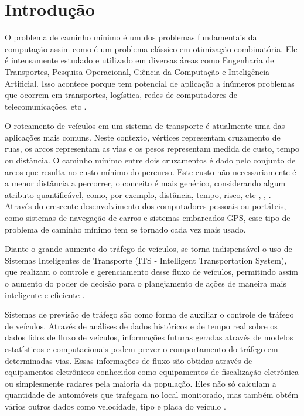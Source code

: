 \chapter{Introdução}

O problema de caminho mínimo é um dos problemas fundamentais da computação assim como é um problema
clássico em otimização combinatória.
Ele é intensamente estudado e utilizado em diversas áreas como Engenharia de Transportes, Pesquisa Operacional, Ciência
da Computação e Inteligência Artificial. Isso acontece porque tem potencial de aplicação a
inúmeros problemas que ocorrem em transportes, logística, redes de computadores de
telecomunicações, etc \cite{peer}.

O roteamento de veículos em um sistema de transporte é atualmente uma das aplicações mais comuns.
Neste contexto, vértices representam cruzamento de ruas, os arcos representam as vias
e os pesos representam medida de custo, tempo ou distância. O caminho mínimo entre dois cruzamentos
é dado pelo conjunto de arcos que resulta no custo mínimo do percurso.
Este custo não necessariamente é a menor distância a percorrer,
o conceito é mais genérico, considerando algum atributo quantificável, como,
por exemplo, distância, tempo, risco, etc \cite{boaventura}, \cite{cormen}, \cite{ziviani}.
Através do crescente desenvolvimento dos computadores pessoais ou portáteis, como sistemas
de navegação de carros e sistemas embarcados GPS, esse tipo de problema de caminho mínimo
tem se tornado cada vez mais usado.

Diante o grande aumento do tráfego de veículos, se torna indispensável o uso de Sistemas Inteligentes
de Transporte (ITS - Intelligent Transportation System), que realizam o controle e gerenciamento desse fluxo de veículos,
permitindo assim o aumento do poder de decisão para o planejamento de ações de maneira
mais inteligente e eficiente \cite{leonard}.

Sistemas de previsão de tráfego são como forma de auxiliar o controle de tráfego de veículos.
Através de análises de dados históricos e de tempo real sobre
os dados lidos de fluxo de veículos, informações futuras geradas através de modelos
estatísticos e computacionais podem prever o comportamento do tráfego em determinadas
vias. Essas informações de fluxo são obtidas através de equipamentos eletrônicos conhecidos
como equipamentos de fiscalização eletrônica ou simplesmente radares pela maioria da
população. Eles não só calculam a quantidade de automóveis que trafegam no local
monitorado, mas também obtém vários outros dados como velocidade, tipo e placa do
veículo \cite{leonard}.

